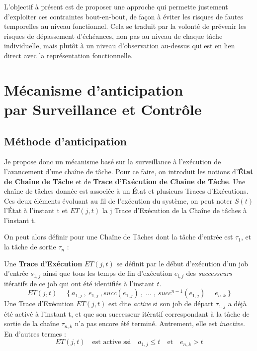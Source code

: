 \documentclass[french, a4paper, 11pt, twoside, pdftex]{StyleThese}
\begin{document}
	\smallbreak 
	
	L'objectif à présent est de proposer une approche qui permette justement d'exploiter ces contraintes bout-en-bout, de façon à éviter les risques de fautes temporelles au niveau fonctionnel. Cela se traduit par la volonté de prévenir les risques de dépassement d'échéances, non pas au niveau de chaque tâche individuelle, mais plutôt à un niveau d'observation au-dessus qui est en lien direct avec la représentation fonctionnelle.
	
    
\section[Mécanisme d'anticipation]{Mécanisme d'anticipation \\ par Surveillance et Contrôle}
    \subsection{Méthode d'anticipation}
    
    Je propose donc un mécanisme basé sur la surveillance à l'exécution de l'avancement d'une chaîne de tâche. 
    Pour ce faire, on introduit les notions d'\textbf{État de Chaîne de Tâche} et de \textbf{Trace d'Exécution de Chaîne de Tâche}. Une chaîne de tâches donnée est associée à un État et plusieurs Traces d'Exécutions. Ces deux éléments évoluant au fil de l'exécution du système, on peut noter $S(t)$ l'État à l'instant t et $ET(j,t)$ la j Trace d'Exécution de la Chaîne de tâches à l'instant t.
    
    On peut alors définir pour une Chaîne de Tâches dont la tâche d'entrée est $\tau_{1}$, et la tâche de sortie $\tau_{n}$ : 
    \begin{definition} \label{def:TraceExecutionChaine}
    	Une \textbf{Trace d'Exécution} $ET(j,t)$ se définit par le début d'exécution d'un job d'entrée $s_{1,j}$ ainsi que tous les temps de fin d'exécution $e_{i,j}$ des \textit{successeurs} itératifs de ce job qui ont été identifiés à l'instant $t$.
    	\begin{equation*}
    		ET(j,t) = \{\: a_{1,j} \:,\: e_{1,j} \:, succ(e_{1,j})\:, \;\dots\; ,\: succ^{n-1}(e_{1,j}) = e_{n,k} \:\}
    	\end{equation*}    	
    	Une Trace d'Exécution $ET(j,t)$ est dite \emph{active} si son job de départ $\tau_{1,j}$ a déjà été activé à l'instant t, et que son successeur itératif correspondant à la tâche de sortie de la chaîne $\tau_{n,k}$ n'a pas encore été terminé. Autrement, elle est \textit{inactive}. En d'autres termes :
    	\begin{equation*}
    		ET(j,t)  \quad \textrm{est active ssi}\quad  a_{1,j} \leq t \quad \textrm{et} \quad e_{n,k} > t
    	\end{equation*}
    \end{definition}
    
\end{document}
